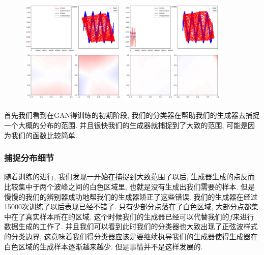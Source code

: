 \documentclass[lang=cn,11pt]{elegantpaper}
\begin{document}
\begin{figure}[hbt]
\centering
  \includegraphics[width=0.45\textwidth]{sin_2_1}
  \includegraphics[width=0.45\textwidth]{sin_2_2}\\
  \caption{}
\end{figure}

首先我们看到在GAN得训练的初期阶段, 我们的分类器在帮助我们的生成器去捕捉一个大概的分布的范围. 并且很快我们的生成器就捕捉到了大致的范围, 可能是因为我们的函数比较简单.


\subsubsection{捕捉分布细节}

随着训练的进行, 我们发现一开始在捕捉到大致范围了以后, 生成器生成的点反而比较集中于两个波峰之间的白色区域里, 也就是没有生成出我们需要的样本. 但是慢慢的我们的辨别器成功地帮我们的生成器矫正了这些错误. 我们的生成器在经过15000次训练了以后表现已经不错了. 只有少部分点落在了白色区域, 大部分点都集中在了真实样本所在的区域. 这个时候我们的生成器已经可以代替我们的$f$来进行数据生成的工作了. 并且我们可以看到此时我们的分类器也大致出现了正弦波样式的分类边界, 这意味着我们得分类器应该是要继续执导我们的生成器使得生成器在白色区域的生成样本逐渐越来越少. 但是事情并不是这样发展的.
\end{document}
